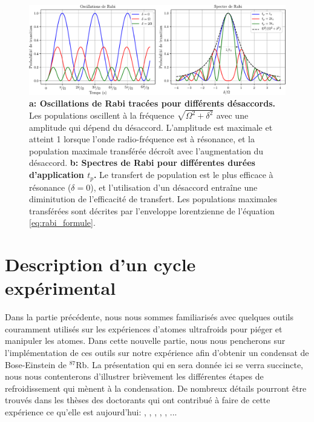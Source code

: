 \begin{figure}
\centering
\includegraphics[width=\textwidth]{fig/BEC_manip/rabi.pdf}
\caption{\textbf{a: Oscillations de Rabi tracées pour différents désaccords.} Les populations oscillent à la fréquence $\sqrt{\Omega^2+\delta^2}$ avec une amplitude qui dépend du désaccord. L'amplitude est maximale et atteint 1 lorsque l'onde radio-fréquence est à résonance, et la population maximale transférée décroît avec l'augmentation du désaccord. \textbf{b: Spectres de Rabi pour différentes durées d'application $t_p$.} Le transfert de population est le plus efficace à résonance ($\delta=0$), et l'utilisation d'un désaccord entraîne une diminitution de l'efficacité de transfert. Les populations maximales transférées sont décrites par l'enveloppe lorentzienne de l'équation \ref{eq:rabi_formule}.}
\label{fig:rabi}
\end{figure}






\section{Description d'un cycle expérimental}
Dans la partie précédente, nous nous sommes familiarisés avec quelques outils couramment utilisés sur les expériences d'atomes ultrafroids pour piéger et manipuler les atomes. Dans cette nouvelle partie, nous nous pencherons sur l'implémentation de ces outils sur notre expérience afin d'obtenir un condensat de Bose-Einstein de ${}^{87}$Rb. La présentation qui en sera donnée ici se verra succincte, nous nous contenterons d'illustrer brièvement les différentes étapes de refroidissement qui mènent à la condensation. De nombreux détails pourront être trouvés dans les thèses des doctorants qui ont contribué à faire de cette expérience ce qu'elle est aujourd'hui: \citep{fauquembergue2004realisation}, \citep{riou2006etude}, \citep{bernard2010transport}, \citep{jendrzejewski2012quantum}, \citep{muller2015coherent}, \citep{denechaud2018vers}... 


